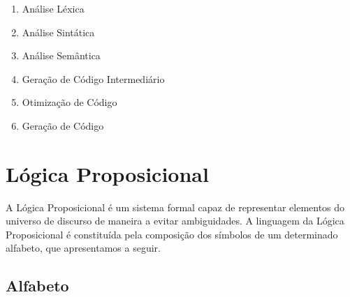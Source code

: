 \documentclass[12pt]{satyrus}
\begin{document}
	\begin{enumerate}
		\item Análise Léxica
		\item Análise Sintática
		\item Análise Semântica
		\item Geração de Código Intermediário
		\item Otimização de Código
		\item Geração de Código
	\end{enumerate}
	

    \section{Lógica Proposicional}
    
   	A Lógica Proposicional é um sistema formal capaz de representar elementos do universo de discurso de maneira a evitar ambiguidades. A linguagem da Lógica Proposicional é constituída pela composição dos símbolos de um determinado alfabeto, que apresentamos a seguir.
   	
   	\subsection{Alfabeto}
   	
\end{document}
